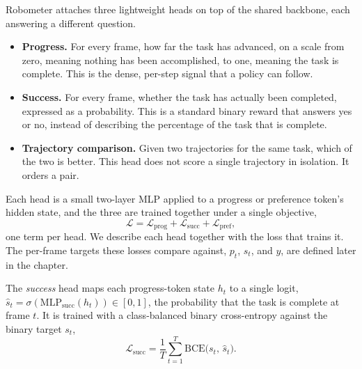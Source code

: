 Robometer attaches three lightweight heads on top of the shared backbone, each answering a different question.

\begin{itemize}
    \item \textbf{Progress.} For every frame, how far the task has advanced, on a scale from zero, meaning nothing has been accomplished, to one, meaning the task is complete. This is the dense, per-step signal that a policy can follow.
    \item \textbf{Success.} For every frame, whether the task has actually been completed, expressed as a probability. This is a standard binary reward that answers yes or no, instead of describing the percentage of the task that is complete.
    \item \textbf{Trajectory comparison.} Given two trajectories for the same task, which of the two is better. This head does not score a single trajectory in isolation. It orders a pair.
\end{itemize}

Each head is a small two-layer MLP applied to a progress or preference token's hidden state, and the three are trained together under a single objective,
\begin{equation}
\mathcal{L} = \mathcal{L}_{\mathrm{prog}} + \mathcal{L}_{\mathrm{succ}} + \mathcal{L}_{\mathrm{pref}} ,
\label{eq:total-loss}
\end{equation}
one term per head. We describe each head together with the loss that trains it. The per-frame targets these losses compare against, $p_t$, $s_t$, and $y$, are defined later in the chapter.

The \emph{success} head maps each progress-token state $h_t$ to a single logit, $\hat{s}_t = \sigma(\mathrm{MLP}_{\mathrm{succ}}(h_t)) \in [0,1]$, the probability that the task is complete at frame $t$. It is trained with a class-balanced binary cross-entropy against the binary target $s_t$,
\begin{equation}
\mathcal{L}_{\mathrm{succ}} = \frac{1}{T}\sum_{t=1}^{T} \mathrm{BCE}\!\big(s_t,\, \hat{s}_t\big).
\end{equation}

